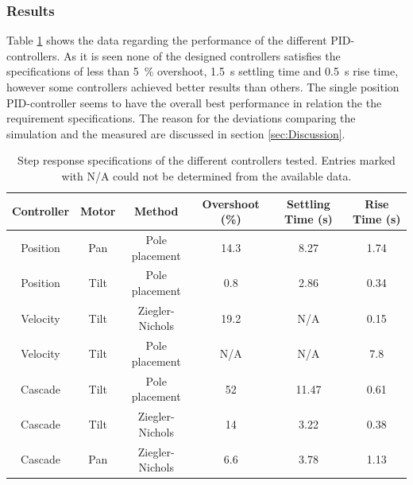 \documentclass[../../main.tex]{subfiles}
\begin{document}
\subsubsection*{Results}
Table \ref{tab:controller_data} shows the data regarding the performance of the different PID-controllers. As it is seen none of the designed controllers satisfies the specifications of less than \SI{5}{\percent} overshoot, \SI{1,5}{\second} settling time and \SI{0,5}{\second} rise time, however some controllers achieved better results than others. The single position PID-controller seems to have the overall best performance in relation the the requirement specifications. The reason for the deviations comparing the simulation and the measured are discussed in section \ref{sec:Discussion}.
\begin{table}[H]
    \centering
    \begin{tabular}{c|c|c|c|c|c}
         Controller & Motor & Method & Overshoot (\%) & Settling Time (s)  & Rise Time (s) \\ \hline
         Position & Pan & Pole placement & 14.3 & 8.27 & 1.74  \\
         Position & Tilt & Pole placement & 0.8 & 2.86 & 0.34  \\
         Velocity & Tilt & Ziegler-Nichols & 19.2 & N/A & 0.15  \\
         Velocity &Tilt & Pole placement & N/A & N/A & 7.8 \\
         Cascade & Tilt  & Pole placement & 52 & 11.47 & 0.61 \\
         Cascade & Tilt & Ziegler-Nichols & 14 & 3.22 & 0.38  \\
         Cascade & Pan & Ziegler-Nichols & 6.6 & 3.78 & 1.13  \\
         
    \end{tabular}
    \caption{Step response specifications of the different controllers tested. Entries marked with N/A could not be determined from the available data.}
    \label{tab:controller_data}
\end{table}
\end{document}
